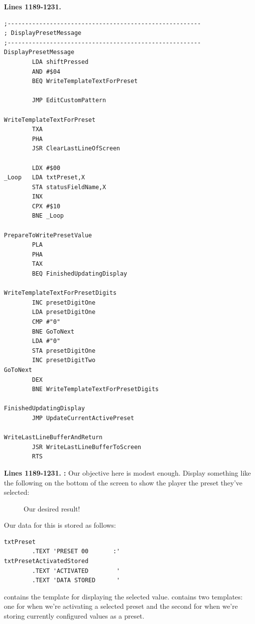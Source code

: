 \clearpage
\textbf{Lines 1189-1231. } 
\begin{lstlisting}
;-------------------------------------------------------
; DisplayPresetMessage
;-------------------------------------------------------
DisplayPresetMessage    
        LDA shiftPressed
        AND #$04
        BEQ WriteTemplateTextForPreset

        JMP EditCustomPattern

WriteTemplateTextForPreset
        TXA 
        PHA 
        JSR ClearLastLineOfScreen

        LDX #$00
_Loop   LDA txtPreset,X
        STA statusFieldName,X
        INX 
        CPX #$10
        BNE _Loop

PrepareToWritePresetValue
        PLA 
        PHA 
        TAX 
        BEQ FinishedUpdatingDisplay

WriteTemplateTextForPresetDigits   
        INC presetDigitOne
        LDA presetDigitOne
        CMP #"0"
        BNE GoToNext
        LDA #"0"
        STA presetDigitOne
        INC presetDigitTwo
GoToNext   
        DEX 
        BNE WriteTemplateTextForPresetDigits

FinishedUpdatingDisplay   
        JMP UpdateCurrentActivePreset

WriteLastLineBufferAndReturn    
        JSR WriteLastLineBufferToScreen
        RTS 
\end{lstlisting}
\clearpage

\textbf{Lines 1189-1231. :} Our objective here is modest enough. Display something like the following
on the bottom of the screen to show the player the preset they've selected:
\begin{figure}[H]                                                          
  \centering                                                             
\caption{Our desired result!}
\end{figure}                                                               
\vspace*{-0.7cm}
Our data for this is stored as follows:
\begin{lstlisting}
txtPreset
        .TEXT 'PRESET 00       :'
txtPresetActivatedStored
        .TEXT 'ACTIVATED        '
        .TEXT 'DATA STORED      '
\end{lstlisting}
 contains the template for displaying the selected value.  contains two templates: one for
when we're activating a selected preset and the second for when we're storing currently configured values as a preset.

